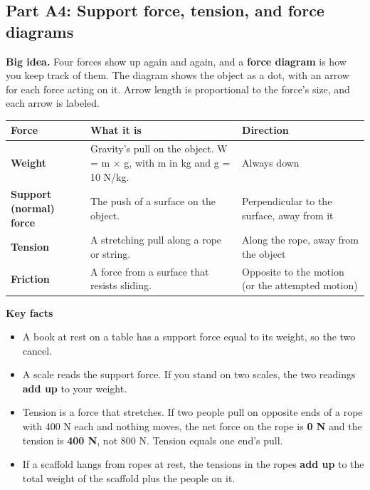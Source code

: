 \documentclass[
]{article}
\newcounter{none} %
\providecommand{\tightlist}{%
  \setlength{\itemsep}{0pt}\setlength{\parskip}{0pt}}
\begin{document}
\subsection{Part A4: Support force, tension, and force
diagrams}\label{part-a4-support-force-tension-and-force-diagrams}

\textbf{Big idea.} Four forces show up again and again, and a
\textbf{force diagram} is how you keep track of them. The diagram shows
the object as a dot, with an arrow for each force acting on it. Arrow
length is proportional to the force's size, and each arrow is labeled.

{\def\LTcaptype{none} %
\begin{longtable}[]{@{}
  >{\raggedright\arraybackslash}p{}
  >{\raggedright\arraybackslash}p{}
  >{\raggedright\arraybackslash}p{}@{}}
\toprule\noalign{}
\begin{minipage}[b]{\linewidth}\raggedright
Force
\end{minipage} & \begin{minipage}[b]{\linewidth}\raggedright
What it is
\end{minipage} & \begin{minipage}[b]{\linewidth}\raggedright
Direction
\end{minipage} \\
\midrule\noalign{}
\endhead
\bottomrule\noalign{}
\endlastfoot
\textbf{Weight} & Gravity's pull on the object. W = m × g, with m in kg
and g = 10 N/kg. & Always down \\
\textbf{Support (normal) force} & The push of a surface on the object. &
Perpendicular to the surface, away from it \\
\textbf{Tension} & A stretching pull along a rope or string. & Along the
rope, away from the object \\
\textbf{Friction} & A force from a surface that resists sliding. &
Opposite to the motion (or the attempted motion) \\
\end{longtable}
}

\textbf{Key facts}

\begin{itemize}
\tightlist
\item
  A book at rest on a table has a support force equal to its weight, so
  the two cancel.
\item
  A scale reads the support force. If you stand on two scales, the two
  readings \textbf{add up} to your weight.
\item
  Tension is a force that stretches. If two people pull on opposite ends
  of a rope with 400 N each and nothing moves, the net force on the rope
  is \textbf{0 N} and the tension is \textbf{400 N}, not 800 N. Tension
  equals one end's pull.
\item
  If a scaffold hangs from ropes at rest, the tensions in the ropes
  \textbf{add up} to the total weight of the scaffold plus the people on
  it.
\end{itemize}
\end{document}
